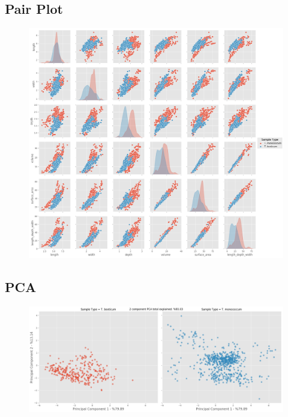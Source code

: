 \documentclass[11pt]{report}
\begin{document}
\subsection{Pair Plot}
\label{sec:org2d53a4f}

\begin{figure}[htbp]
\centering
\includegraphics[width=18cm]{./images/results/group1/pairplot.png}
\label{fig:orgef2c0d6}
\end{figure}

\clearpage
\subsection{PCA}
\label{sec:org5311ecc}
\begin{figure}[htbp]
\centering
\includegraphics[width=18cm]{./images/results/group1/pca.png}
\label{fig:org9e703de}
\end{figure}
\end{document}

